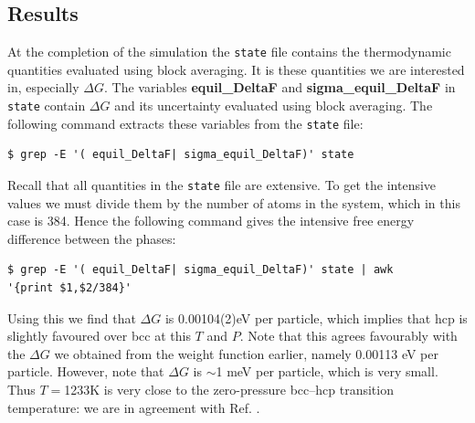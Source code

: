\documentclass{report}
\begin{document}
\subsection{Results}
At the completion of the simulation the \texttt{state} file contains the thermodynamic quantities evaluated using block averaging. It is these quantities we
are interested in, especially $\Delta G$. The variables \textbf{equil\_DeltaF} and \textbf{sigma\_equil\_DeltaF} in \texttt{state} contain 
$\Delta G$ and its uncertainty evaluated using block averaging. The following command extracts these variables from the \texttt{state} file:
\begin{verbatim}
$ grep -E '( equil_DeltaF| sigma_equil_DeltaF)' state
\end{verbatim} 
Recall that all quantities in the \texttt{state} file are extensive. To get the intensive values we must divide them by the number of atoms in the system, 
which in this case is 384. Hence the following command gives the intensive free energy difference between the phases:
\begin{verbatim}
$ grep -E '( equil_DeltaF| sigma_equil_DeltaF)' state | awk
'{print $1,$2/384}'
\end{verbatim}
Using this we find that $\Delta G$ is 0.00104(2)eV per particle, which implies that hcp is slightly favoured over bcc at this $T$ and $P$.
Note that this agrees favourably with the $\Delta G$ we obtained from the weight function earlier, namely 0.00113 eV per particle.
However, note that $\Delta G$ is $\sim$1 meV per particle, which is very small. Thus $T=$1233K is very close to the zero-pressure bcc--hcp transition
temperature: we are in agreement with Ref. \cite{Mendelev_2007}.
\end{document}
